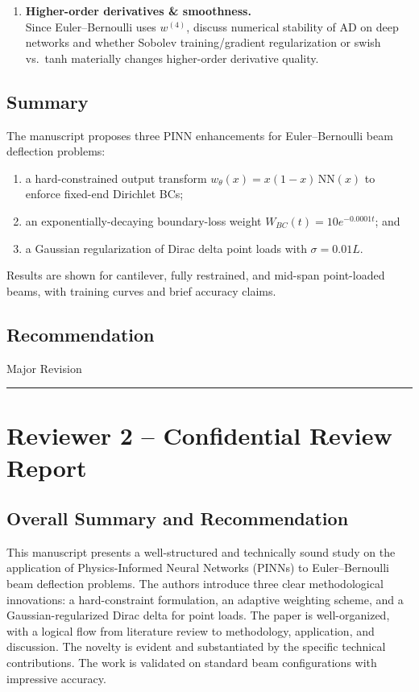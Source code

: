 \documentclass[11pt]{article}
\begin{document}
\begin{enumerate}
    \item \textbf{Higher-order derivatives \& smoothness.}\\
    Since Euler--Bernoulli uses $w^{(4)}$, discuss numerical stability of AD on deep networks and whether Sobolev training/gradient regularization or swish vs.\ tanh materially changes higher-order derivative quality.
\end{enumerate}

\subsection*{Summary}
The manuscript proposes three PINN enhancements for Euler--Bernoulli beam deflection problems:
\begin{enumerate}
    \item a hard-constrained output transform $w_\theta(x)=x(1-x)\,\mathrm{NN}(x)$ to enforce fixed-end Dirichlet BCs;
    \item an exponentially-decaying boundary-loss weight $W_{BC}(t)=10e^{-0.0001t}$; and
    \item a Gaussian regularization of Dirac delta point loads with $\sigma=0.01L$.
\end{enumerate}
Results are shown for cantilever, fully restrained, and mid-span point-loaded beams, with training curves and brief accuracy claims.

\subsection*{Recommendation}
Major Revision

\vspace{12pt}
\hrule
\vspace{12pt}

\section*{Reviewer 2 -- Confidential Review Report}

\subsection*{Overall Summary and Recommendation}
This manuscript presents a well-structured and technically sound study on the application of Physics-Informed Neural Networks (PINNs) to Euler--Bernoulli beam deflection problems. The authors introduce three clear methodological innovations: a hard-constraint formulation, an adaptive weighting scheme, and a Gaussian-regularized Dirac delta for point loads. The paper is well-organized, with a logical flow from literature review to methodology, application, and discussion. The novelty is evident and substantiated by the specific technical contributions. The work is validated on standard beam configurations with impressive accuracy.
\end{document}

